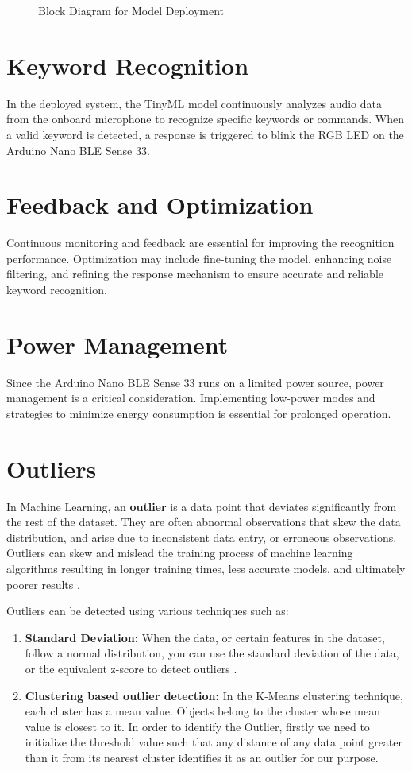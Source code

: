 \begin{figure}[h!]
	\centering
	
	\caption{Block Diagram for Model Deployment } \label{fig:ModelDeployment}
\end{figure}

\section{Keyword Recognition}
In the deployed system, the TinyML model continuously analyzes audio data from the onboard microphone to recognize specific keywords or commands. When a valid keyword is detected, a response is triggered to blink the RGB LED on the Arduino Nano BLE Sense 33.

\section{Feedback and Optimization}
Continuous monitoring and feedback are essential for improving the recognition performance. Optimization may include fine-tuning the model, enhancing noise filtering, and refining the response mechanism to ensure accurate and reliable keyword recognition.

\section{Power Management}
Since the Arduino Nano BLE Sense 33 runs on a limited power source, power management is a critical consideration. Implementing low-power modes and strategies to minimize energy consumption is essential for prolonged operation.

\section{Outliers}
In Machine Learning, an \textbf{outlier} is a data point that deviates significantly from the rest of the dataset. They are often abnormal observations that skew the data distribution, and arise due to inconsistent data entry, or erroneous observations. Outliers can skew and mislead the training process of machine learning algorithms resulting in longer training times, less accurate models, and ultimately poorer results \cite{Nichani:2020}.

Outliers can be detected using various techniques such as:
\begin{enumerate}
	\item \textbf{Standard Deviation:} When the data, or certain features in the dataset, follow a normal distribution, you can use the standard deviation of the data, or the equivalent z-score to detect outliers \cite{C:2022}.
	
	\item \textbf{Clustering based outlier detection:} In the K-Means clustering technique, each cluster has a mean value. Objects belong to the cluster whose mean value is closest to it. In order to identify the Outlier, firstly we need to initialize the threshold value such that any distance of any data point greater than it from its nearest cluster identifies it as an outlier for our purpose.
\end{enumerate}

